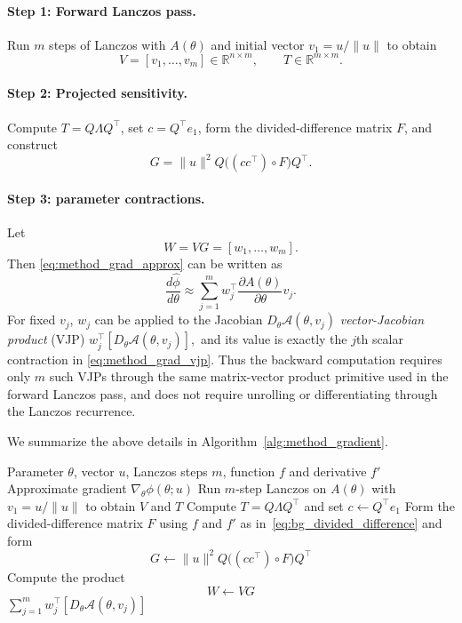 \documentclass{article}
\begin{document}
\paragraph{Step 1: Forward Lanczos pass.}
Run $m$ steps of Lanczos with $A(\theta)$ and initial vector $v_1=u/\|u\|$ to obtain
\[
    V=[v_1,\ldots,v_m]\in\mathbb{R}^{n\times m},
    \qquad
    T\in\mathbb{R}^{m\times m}.
\]

\paragraph{Step 2: Projected sensitivity.}
Compute $T=Q\Lambda Q^\top$, set $c=Q^\top e_1$, form the divided-difference matrix
$F$, and construct
\[
    G
    =
    \|u\|^2 Q\bigl((cc^\top)\circ F\bigr)Q^\top .
\]

\paragraph{Step 3: parameter contractions.}
Let
\[
    W = VG = [w_1,\ldots,w_m].
\]
Then \eqref{eq:method_grad_approx} can be written as
\begin{equation}
    \frac{d\widehat{\phi}}{d\theta}
    \approx
    \sum_{j=1}^{m}
    w_j^\top
    \frac{\partial A(\theta)}{\partial\theta}
    v_j .
    \label{eq:method_grad_vjp}
\end{equation}
For fixed $v_j$, $w_j$ can be applied to the Jacobian
$D_\theta\mathcal{A}(\theta,v_j)$ 
\emph{vector-Jacobian product} (VJP)
$ w_j^\top [D_\theta\mathcal{A}(\theta,v_j)],
$
and its value is exactly the $j$th scalar contraction in
\eqref{eq:method_grad_vjp}. Thus the backward computation requires only $m$ such VJPs
through the same matrix-vector product primitive used in the forward Lanczos pass, and
does not require unrolling or differentiating through the Lanczos recurrence. 

We summarize the above details in Algorithm~\ref{alg:method_gradient}.


\begin{algorithm}[H]
\caption{Approximate gradient of $\phi(\theta;u)=u^\top f(A(\theta))u$}
\label{alg:method_gradient}
\begin{algorithmic}[1]
\Require Parameter $\theta$, vector $u$, Lanczos steps $m$, function $f$ and derivative $f'$
\Ensure Approximate gradient $\nabla_{\theta} \phi(\theta ; u)$
\State Run $m$-step Lanczos on $A(\theta)$ with $v_1=u/\|u\|$ to obtain $V$ and $T$
\State Compute $T=Q\Lambda Q^\top$ and set $c\leftarrow Q^\top e_1$
\State Form the divided-difference matrix $F$ using $f$ and $f'$ as in~\eqref{eq:bg_divided_difference} and form
 \[G \leftarrow \|u\|^2 Q\bigl((cc^\top)\circ F\bigr)Q^\top\]
 \State Compute the product \[W \leftarrow VG\]
\State \Return $\displaystyle
    \sum_{j=1}^{m}
    w_j^\top[D_\theta\mathcal{A}(\theta,v_j)]$
\end{algorithmic}
\end{algorithm}
\end{document}
